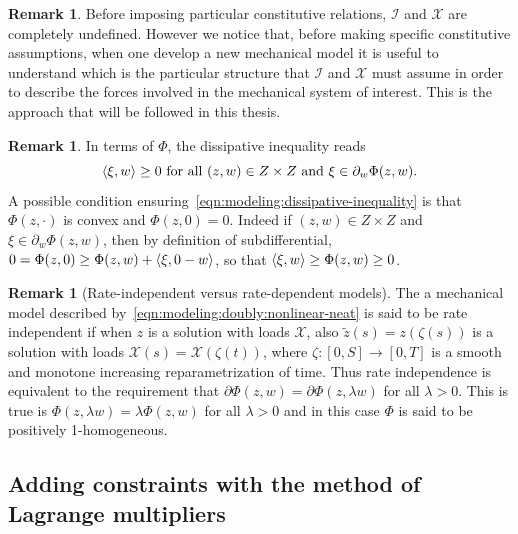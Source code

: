 \documentclass[a4paper,10pt,twoside]{amsbook}
\numberwithin{section}{chapter}
\numberwithin{equation}{chapter}
\theoremstyle{definition}
\newtheorem{rmk}[prop]{Remark}
\DeclarePairedDelimiter{\dual}{\langle}{\rangle}
\begin{document}
\begin{rmk}
Before imposing particular constitutive relations, $\mathcal{I}$ and $\mathcal{X}$ are completely undefined. However we notice that, before making specific constitutive assumptions, when one develop a new mechanical model it is useful to understand which is the particular structure that $\mathcal{I}$ and $\mathcal{X}$ must assume in order to describe the forces involved in the mechanical system of interest. This is the approach that will be followed in this thesis.
\end{rmk}
\begin{rmk}
In terms of $\Phi$, the dissipative inequality reads
\begin{equation}
\label{eqn:modeling:dissipative-inequality}
\text{$\dual{\xi,w}\ge0$ for all $(z,w)\in Z\times Z$ and $\xi\in\partial_w\Phi(z,w)$}.
\end{equation}
A possible condition ensuring~\eqref{eqn:modeling:dissipative-inequality} is that $\Phi(z,\cdot)$ is convex and $\Phi(z,0)=0$. Indeed if $(z,w)\in Z\times Z$ and $\xi\in\partial_w\Phi(z,w)$, then by definition of subdifferential, $0=\Phi(z,0)\ge\Phi(z,w)+\dual{\xi,0-w}$, so that $\dual{\xi,w}\ge\Phi(z,w)\ge0$.
\end{rmk}
\begin{rmk}[Rate-independent versus rate-dependent models]
The a mechanical model described by~\eqref{eqn:modeling:doubly:nonlinear-neat} is said to be rate independent if when $z$ is a solution with loads $\mathcal{X}$, also $\tilde z(s)=z(\zeta(s))$ is a solution with loads $\mathcal{X}(s)=\mathcal{X}(\zeta(t))$, where $\zeta\colon[0,S]\to[0,T]$ is a smooth and monotone increasing reparametrization of time. Thus rate independence is equivalent to the requirement that $\partial\Phi(z,w)=\partial\Phi(z,\lambda w)$ for all $\lambda>0$. This is true is $\Phi(z,\lambda w)=\lambda\Phi(z,w)$ for all $\lambda>0$ and in this case $\Phi$ is said to be positively 1-homogeneous.
\end{rmk}

\subsection{Adding constraints with the method of Lagrange multipliers}
\label{subsec:lagrange-multipliers}
\end{document}
